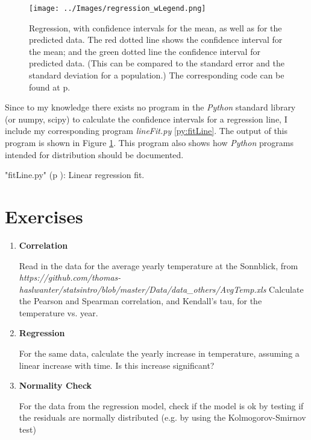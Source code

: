 \begin{figure}
  \centering
  \texttt{[image: ../Images/regression\_wLegend.png]}\\
  \caption{Regression, with confidence intervals for the mean, as well as for the predicted data. The red dotted line shows the confidence interval for the mean; and the green dotted line the confidence interval for predicted data. (This can be compared to the standard error and the standard deviation for a population.) The corresponding code can be found
  at p. \pageref{py:fitLine}} \label{fig:regline}
\end{figure}

Since to my knowledge there exists no program in the \emph{Python} standard library (or numpy, scipy) to calculate the confidence intervals for a regression line, I include my corresponding program \emph{lineFit.py} \ref{py:fitLine}. The output of this program is shown in Figure \ref{fig:regline}. This program also shows how \emph{Python} programs intended for distribution should be documented.

\PyImg "fitLine.py" (p \pageref{py:fitLine}): Linear regression fit.

\section{Exercises}

\begin{enumerate}
  \item \textbf{Correlation}

    Read in the data for the average yearly temperature at the Sonnblick, from     \emph{https://github.com/thomas-haslwanter/statsintro/blob/master/Data/data\_others/AvgTemp.xls}
    Calculate the Pearson and Spearman correlation, and Kendall's tau, for the temperature vs. year.

  \item \textbf{Regression}

    For the same data, calculate the yearly increase in temperature, assuming a linear increase with time.
    Is this increase significant?

  \item \textbf{Normality Check}

    For the data from the regression model, check if the model is ok by testing if the residuals are normally distributed (e.g. by using the Kolmogorov-Smirnov test)

\end{enumerate}


